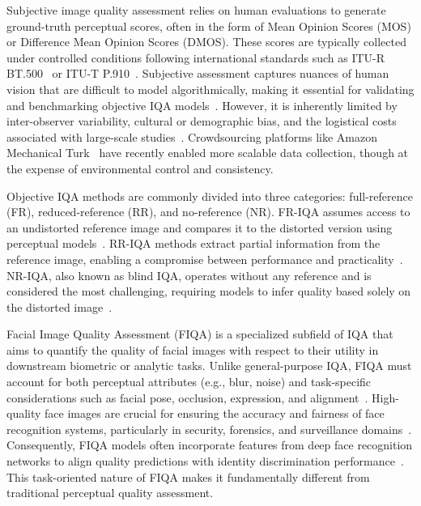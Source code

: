 Subjective image quality assessment relies on human evaluations to generate ground-truth perceptual scores, often in the form of Mean Opinion Scores (MOS) or Difference Mean Opinion Scores (DMOS). These scores are typically collected under controlled conditions following international standards such as ITU-R BT.500~\cite{itu_bt500_2023} or ITU-T P.910~\cite{itu_p910_2008}. Subjective assessment captures nuances of human vision that are difficult to model algorithmically, making it essential for validating and benchmarking objective IQA models~\cite{ponomarenko_tid2013, zaric_comparison_objective_subjective}. However, it is inherently limited by inter-observer variability, cultural or demographic bias, and the logistical costs associated with large-scale studies~\cite{ghadiyaram_crowdsourced_study_2016}. Crowdsourcing platforms like Amazon Mechanical Turk~\cite{amazon_mturk} have recently enabled more scalable data collection, though at the expense of environmental control and consistency.

Objective IQA methods are commonly divided into three categories: full-reference (FR), reduced-reference (RR), and no-reference (NR). FR-IQA assumes access to an undistorted reference image and compares it to the distorted version using perceptual models~\cite{wang_ssim_2004, sheikh_ifc_2005, zhang_fsim_2011}. RR-IQA methods extract partial information from the reference image, enabling a compromise between performance and practicality~\cite{wang_wavelet_statistics_2005, li_divisive_normalization_2009}. NR-IQA, also known as blind IQA, operates without any reference and is considered the most challenging, requiring models to infer quality based solely on the distorted image~\cite{mittal_brisque_2012, bosse_deep_nriqa_2018}.

Facial Image Quality Assessment (FIQA) is a specialized subfield of IQA that aims to quantify the quality of facial images with respect to their utility in downstream biometric or analytic tasks. Unlike general-purpose IQA, FIQA must account for both perceptual attributes (e.g., blur, noise) and task-specific considerations such as facial pose, occlusion, expression, and alignment~\cite{hernandez_fiqanet_2020, boutros_iqface_2021, li_biofacenet_2021}. High-quality face images are crucial for ensuring the accuracy and fairness of face recognition systems, particularly in security, forensics, and surveillance domains~\cite{xu_secureqnet_2020, luo_deepiq_2018}. Consequently, FIQA models often incorporate features from deep face recognition networks to align quality predictions with identity discrimination performance~\cite{FaceMetric2025}. This task-oriented nature of FIQA makes it fundamentally different from traditional perceptual quality assessment.

